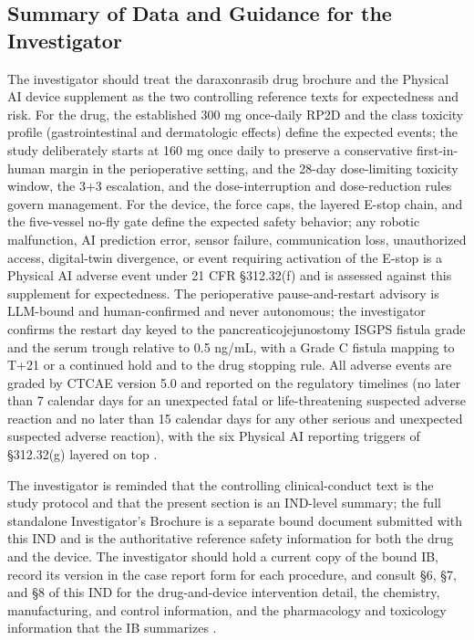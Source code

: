 \subsection*{Summary of Data and Guidance for the Investigator}

The investigator should treat the daraxonrasib drug brochure and the Physical AI
device supplement as the two controlling reference texts for expectedness and risk.
For the drug, the established 300 mg once-daily RP2D and the class toxicity profile
(gastrointestinal and dermatologic effects) define the expected events; the study
deliberately starts at 160 mg once daily to preserve a conservative first-in-human
margin in the perioperative setting, and the 28-day dose-limiting toxicity window,
the 3+3 escalation, and the dose-interruption and dose-reduction rules govern
management. For the device, the force caps, the layered E-stop chain, and the
five-vessel no-fly gate define the expected safety behavior; any robotic
malfunction, AI prediction error, sensor failure, communication loss, unauthorized
access, digital-twin divergence, or event requiring activation of the E-stop is a
Physical AI adverse event under 21 CFR \S 312.32(f) and is assessed against this
supplement for expectedness. The perioperative pause-and-restart advisory is
LLM-bound and human-confirmed and never autonomous; the investigator confirms the
restart day keyed to the pancreaticojejunostomy ISGPS fistula grade and the serum
trough relative to 0.5 ng/mL, with a Grade C fistula mapping to T+21 or a continued
hold and to the drug stopping rule. All adverse events are graded by CTCAE version
5.0 and reported on the regulatory timelines (no later than 7 calendar days for an
unexpected fatal or life-threatening suspected adverse reaction and no later than
15 calendar days for any other serious and unexpected suspected adverse reaction),
with the six Physical AI reporting triggers of \S 312.32(g) layered on top
\cite{daraxwhipple,cfr312paiuni,ichpaistduni}.

The investigator is reminded that the controlling clinical-conduct text is the
study protocol and that the present section is an IND-level summary; the full
standalone Investigator's Brochure is a separate bound document submitted with this
IND and is the authoritative reference safety information for both the drug and the
device. The investigator should hold a current copy of the bound IB, record its
version in the case report form for each procedure, and consult \S 6, \S 7, and
\S 8 of this IND for the drug-and-device intervention detail, the chemistry,
manufacturing, and control information, and the pharmacology and toxicology
information that the IB summarizes \cite{phase1guidance,daraxwhipple,oncotrialllm}.
